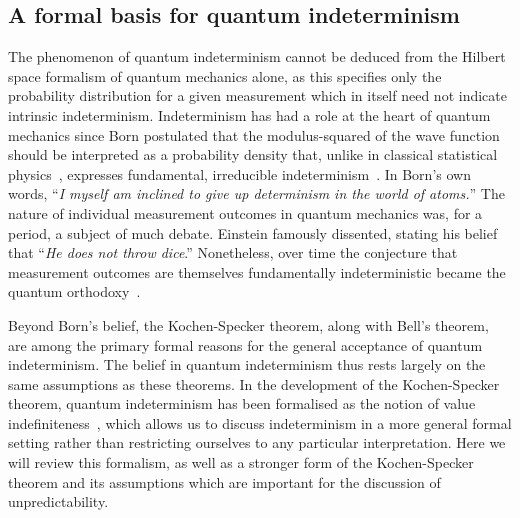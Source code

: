 \documentclass[%
 superscriptaddress,
 preprint,
 showpacs,
 showkeys,
 preprintnumbers,
  amsmath,amssymb,
  aps,
 pra,
  longbibliography,
  floatfix,
 ]{revtex4-1}
\theoremstyle{definition}
\begin{document}
\subsection{A formal basis for quantum indeterminism}
\label{sec:FQI}

The phenomenon of quantum indeterminism cannot be deduced from the Hilbert space formalism of quantum mechanics alone, as this specifies only the probability distribution for a given measurement which in itself need not indicate intrinsic indeterminism.
Indeterminism has had a role at the heart of quantum mechanics since Born postulated that the modulus-squared of the wave function should be interpreted as a probability density that, unlike in classical statistical physics~\cite{Myrvold2011237}, expresses fundamental,  irreducible indeterminism~\cite{born-26-1}.
In Born's own words, ``{\em I myself am inclined  to give up determinism in the world of atoms.}''
The nature of individual measurement outcomes in quantum mechanics was, for a period, a subject of much debate.
Einstein famously dissented, stating his belief that \cite[p. 204]{born-69} ``\emph{He does not throw dice}.''
Nonetheless, over time the conjecture that measurement outcomes are themselves fundamentally indeterministic became the quantum orthodoxy~\cite{zeil-05_nature_ofQuantum}.


{\color{green} Beyond Born's belief, the} Kochen-Specker theorem, along with Bell's theorem, are among the primary {\color{green} formal} reasons for the general acceptance of quantum indeterminism.
The belief in quantum indeterminism thus rests largely on the same assumptions as these theorems.
In the development of the Kochen-Specker theorem, quantum indeterminism has been formalised as the notion of value indefiniteness~\cite{2012-incomput-proofsCJ}, which allows us to discuss indeterminism in a more general formal setting rather than restricting ourselves to any particular interpretation.
Here we will review this formalism, as well as a stronger form of the Kochen-Specker theorem and its assumptions which are important for the discussion of unpredictability.
\end{document}
